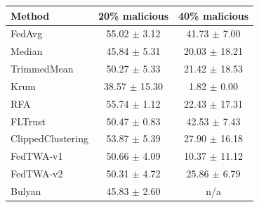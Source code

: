 \begin{tabular}{lcc}
\toprule
Method & 20\% malicious & 40\% malicious \\
\midrule
FedAvg & 55.02 $\pm$ 3.12 & 41.73 $\pm$ 7.00 \\
Median & 45.84 $\pm$ 5.31 & 20.03 $\pm$ 18.21 \\
TrimmedMean & 50.27 $\pm$ 5.33 & 21.42 $\pm$ 18.53 \\
Krum & 38.57 $\pm$ 15.30 & 1.82 $\pm$ 0.00 \\
RFA & 55.74 $\pm$ 1.12 & 22.43 $\pm$ 17.31 \\
FLTrust & 50.47 $\pm$ 0.83 & 42.53 $\pm$ 7.43 \\
ClippedClustering & 53.87 $\pm$ 5.39 & 27.90 $\pm$ 16.18 \\
FedTWA-v1 & 50.66 $\pm$ 4.09 & 10.37 $\pm$ 11.12 \\
FedTWA-v2 & 50.31 $\pm$ 4.72 & 25.86 $\pm$ 6.79 \\
Bulyan & 45.83 $\pm$ 2.60 & n/a \\
\bottomrule
\end{tabular}